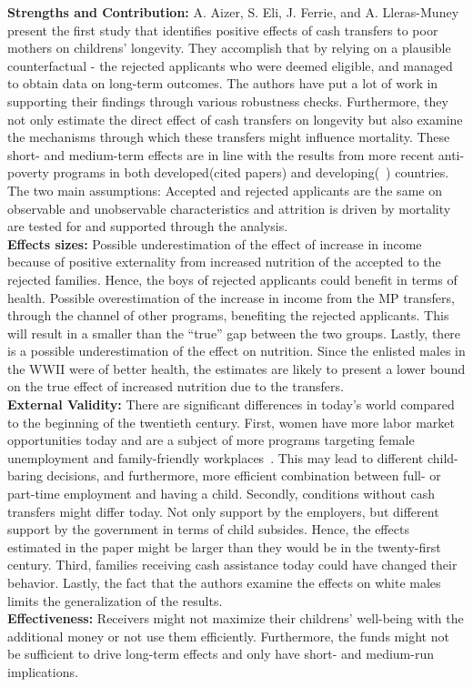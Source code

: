 \textbf{Strengths and Contribution:} A. Aizer, S. Eli, J. Ferrie, and A. Lleras-Muney present the first study that identifies positive effects of cash transfers to poor mothers on childrens' longevity. They accomplish that by relying on a plausible counterfactual - the rejected applicants who were deemed eligible, and managed to obtain data on long-term outcomes. The authors have put a lot of work in supporting their findings through various robustness checks. Furthermore, they not only estimate the direct effect of cash transfers on longevity but also examine the mechanisms through which these transfers might influence mortality. These short- and medium-term effects are in line with the results from more recent anti-poverty programs in both developed(cited papers) and developing(~\citep{barham2011healthier, barham2013living}) countries. The two main assumptions: Accepted and rejected applicants are the same on observable and unobservable characteristics and attrition is driven by mortality are tested for and supported through the analysis.   \\
\textbf{Effects sizes:} Possible underestimation of the effect of increase in income because of positive
externality from increased nutrition of the accepted to the rejected families. Hence, the boys of rejected applicants could benefit in terms of health. Possible overestimation of the increase in income from the MP transfers, through the channel of other programs, benefiting the rejected applicants. This will result in a smaller than the ``true'' gap between the two groups. Lastly, there is a possible underestimation of the effect on nutrition. Since the enlisted males in the WWII were of better health, the estimates are likely to present a lower bound on the true effect of increased nutrition due to the transfers. \\
\textbf{External Validity:} There are significant differences in today's world compared to the beginning of the twentieth century. First, women have more labor market opportunities today and are a subject of more programs targeting female unemployment and family-friendly workplaces~\citep{lauber2016helping}. This may lead to different child-baring decisions, and furthermore, more efficient combination between full- or part-time employment and having a child. Secondly, conditions without cash transfers might differ today. Not only support by the employers, but different support by the government in terms of child subsides. Hence, the effects estimated in the paper might be larger than they would be in the twenty-first century. Third, families receiving cash assistance today could have changed their behavior. Lastly, the fact that the authors examine the effects on white males limits the generalization of the results.\\   
\textbf{Effectiveness:} Receivers might not maximize their childrens' well-being with the additional money or not use them efficiently. Furthermore, the funds might not be sufficient to drive long-term effects and only have short- and medium-run implications. 